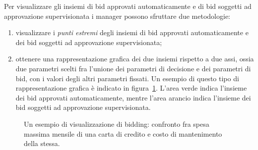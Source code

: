 Per visualizzare gli insiemi di bid approvati automaticamente e di bid soggetti ad approvazione supervisionata i manager possono sfruttare due metodologie:
\begin{enumerate}
	\item visualizzare i \emph{punti estremi} degli insiemi di bid approvati automaticamente e dei bid soggetti ad approvazione supervisionata;

	\item ottenere una rappresentazione grafica dei due insiemi rispetto a due assi, ossia due parametri scelti fra l'unione dei parametri di decisione e dei parametri di bid, con i valori degli altri parametri fissati.
	Un esempio di questo tipo di rappresentazione grafica è indicato in figura~\ref{fig:visualization-bidding}.
	L'area verde indica l'insieme dei bid approvati automaticamente, mentre l'area arancio indica l'insieme dei bid soggetti ad approvazione supervisionata.
\end{enumerate}

\begin{figure}
\centering
	\caption{Un esempio di visualizzazione di bidding: confronto fra spesa massima mensile di una carta di credito e costo di mantenimento della stessa.}
	\label{fig:visualization-bidding}
\end{figure}

